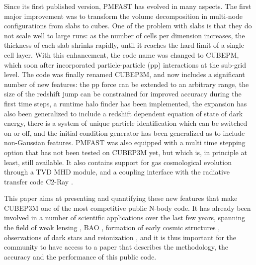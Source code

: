 Since its first published version, {\small PMFAST} has evolved in many aspects. 
The first major improvement was to transform the volume decomposition in multi-node configurations 
from slabs to cubes. One of the problem with slabs is that they do not scale well to large runs: 
as the number of cells per dimension increases, the thickness of each slab shrinks rapidly,
until it reaches the hard limit of a single cell layer.  With this enhancement, the code name was changed to {\small CUBEPM},
which soon after incorporated particle-particle (pp) interactions at the sub-grid level. 
The code was finally renamed {\small CUBEP3M}, and now includes a significant number of new features: the pp force
can be extended to an arbitrary range, the size of the redshift jump can be constrained for improved accuracy during the first time steps,
a runtime halo finder has been implemented, the expansion has also been generalized to include a redshift dependent equation of state of dark energy, there is a system of unique particle identification which can be switched on or off, and the initial condition generator has been generalized as to include non-Gaussian features.
 {\small PMFAST} was also equipped with a multi time stepping option that has not been tested on {\small CUBEP3M} yet, but which is, in principle at least, still available. 
 It also contains support for gas cosmological evolution through a TVD MHD module,
 and a coupling interface with the radiative transfer code C2-Ray \citep{C2-Ray...}. 

This paper aims at presenting and quantifying these new features that make {\small CUBEP3M} one of the most competitive public N-body code.
It has already been involved in a number of scientific applications over the last few years,
spanning the field of weak lensing \citep{Vafaei10, 2008MNRAS.388.1819L,  2009arXiv0905.0501D, 2010PhRvD..81l3015L, 2010arXiv1012.0444Y, 2012arXiv1202.2332H},  BAO
 \citep{2010arXiv1008.3506Z,  2011arXiv1106.5548N, 2011arXiv1109.5746H, 2012arXiv1205.4989H}, 
formation of early cosmic structures \citep{2008arXiv0806.2887I,2010arXiv1005.2502I},
observations of dark stars \citep{2010MNRAS.407L..74Z,2012MNRAS.tmp.2794I} and
reionization \citep{2011arXiv1107.4772I,Fernandez:2011ab,2011MNRAS.413.1353F,2012MNRAS.422..926M,Datta:2011hv,2012arXiv1203.0517F},  
and it is thus important for the community to have access to a paper that describes the methodology, the accuracy and the performance of this public code. 


